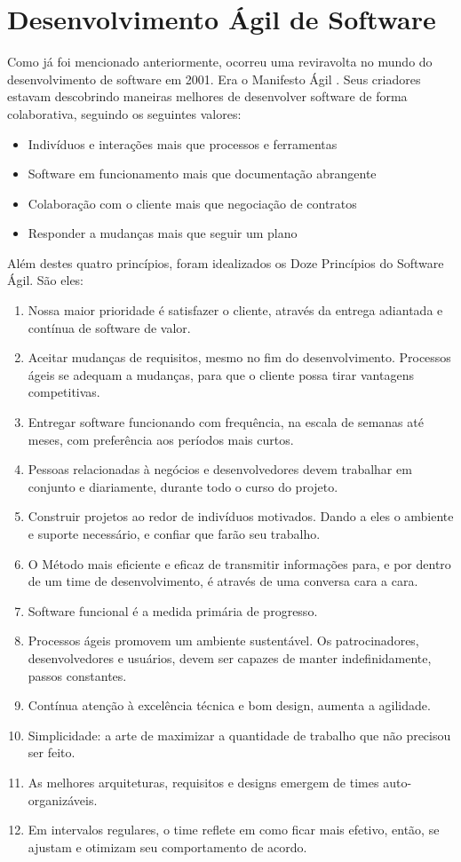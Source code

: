 \documentclass[a4paper,11pt]{article}
\begin{document}
\section{Desenvolvimento Ágil de Software}
Como já foi mencionado anteriormente, ocorreu uma reviravolta no mundo do desenvolvimento de software em 2001. Era o Manifesto Ágil \cite{agileManifesto}. Seus criadores estavam descobrindo maneiras melhores de desenvolver software de forma colaborativa, seguindo os seguintes valores:
\begin{itemize}
	\item Indivíduos e interações mais que processos e ferramentas
	\item Software em funcionamento mais que documentação abrangente
	\item Colaboração com o cliente mais que negociação de contratos
	\item Responder a mudanças mais que seguir um plano
\end{itemize}

Além destes quatro princípios, foram idealizados os Doze Princípios do Software Ágil. São eles:
\begin{enumerate}
	\item Nossa maior prioridade é satisfazer o cliente, através da entrega adiantada e contínua de software de valor.
	\item Aceitar mudanças de requisitos, mesmo no fim do desenvolvimento. Processos ágeis se adequam a mudanças, para que o cliente possa tirar vantagens competitivas.
	\item Entregar software funcionando com frequência, na escala de semanas até meses, com preferência aos períodos mais curtos.
	\item Pessoas relacionadas à negócios e desenvolvedores devem trabalhar em conjunto e diariamente, durante todo o curso do projeto.
	\item Construir projetos ao redor de indivíduos motivados. Dando a eles o ambiente e suporte necessário, e confiar que farão seu trabalho.
	\item O Método mais eficiente e eficaz de transmitir informações para, e por dentro de um time de desenvolvimento, é através de uma conversa cara a cara.
	\item Software funcional é a medida primária de progresso.
	\item Processos ágeis promovem um ambiente sustentável. Os patrocinadores, desenvolvedores e usuários, devem ser capazes de manter indefinidamente, passos constantes.
	\item Contínua atenção à excelência técnica e bom design, aumenta a agilidade.
	\item Simplicidade: a arte de maximizar a quantidade de trabalho que não precisou ser feito.
	\item As melhores arquiteturas, requisitos e designs emergem de times auto-organizáveis.
	\item Em intervalos regulares, o time reflete em como ficar mais efetivo, então, se ajustam e otimizam seu comportamento de acordo.
\end{enumerate}
\end{document}
